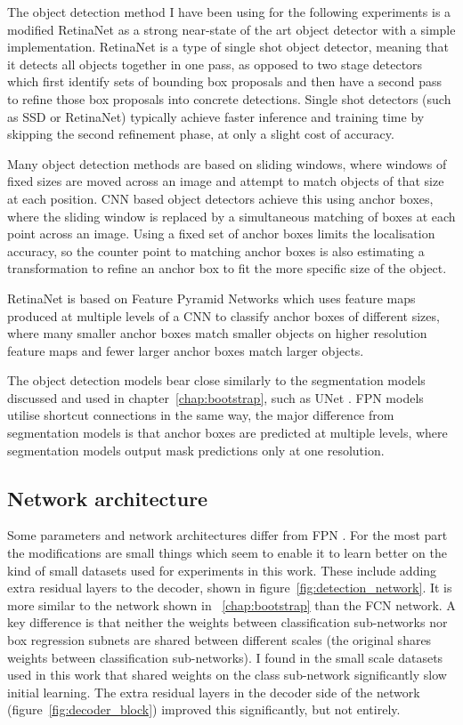 The object detection method I have been using for the following experiments is a modified RetinaNet \cite{Lin2017} as a strong near-state of the art object detector with a simple implementation. RetinaNet is a type of single shot object detector, meaning that it detects all objects together in one pass, as opposed to two stage detectors which first identify sets of bounding box proposals and then have a second pass to refine those box proposals into concrete detections. Single shot detectors (such as \gls{SSD} \cite{Liu2016a} or RetinaNet) typically achieve faster inference and training time by skipping the second refinement phase, at only a slight cost of accuracy.  

Many object detection methods are based on sliding windows, where windows of fixed sizes are moved across an image and attempt to match objects of that size at each position. \gls{CNN} based object detectors achieve this using anchor boxes, where the sliding window is replaced by a simultaneous matching of boxes at each point across an image. Using a fixed set of anchor boxes limits the localisation accuracy, so the counter point to matching anchor boxes is also estimating a transformation to refine an anchor box to fit the more specific size of the object.

RetinaNet is based on Feature Pyramid Networks \cite{Lin2017a} which uses feature maps produced at multiple levels of a \gls{CNN} to classify anchor boxes of different sizes, where many smaller anchor boxes match smaller objects on higher resolution feature maps and fewer larger anchor boxes match larger objects. 

The object detection models bear close similarly to the segmentation models discussed and used in chapter~\ref{chap:bootstrap}, such as UNet \cite{Ronneberger2015}. \gls{FPN} models utilise shortcut connections in the same way, the major difference from segmentation models is that anchor boxes are predicted at multiple levels, where segmentation models output mask predictions only at one resolution.


\subsection {Network architecture}
\label{sec:architecture}

Some parameters and network architectures differ from \gls{FPN} \cite{Lin2017a}. For the most part the modifications are small things which seem to enable it to learn better on the kind of small datasets used for experiments in this work. These include adding extra residual layers to the decoder, shown in figure~\ref{fig:detection_network}. It is more similar to the network shown in ~\ref{chap:bootstrap} than the \gls{FCN} network. A key difference is that neither the weights between classification sub-networks nor box regression subnets are shared between different scales  (the original shares weights between classification sub-networks). I found in the small scale datasets used in this work that shared weights on the class sub-network significantly slow initial learning. The extra residual layers in the decoder side of the network (figure~\ref{fig:decoder_block}) improved this significantly, but not entirely. 

